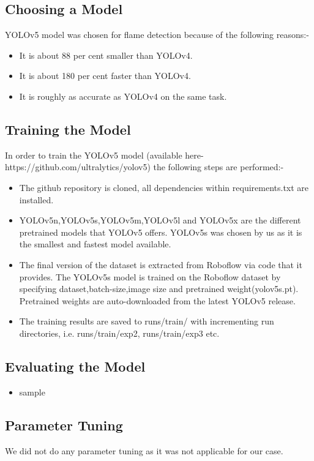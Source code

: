 \documentclass[conference]{IEEEtran}
\begin{document}
\subsection{Choosing a Model}
YOLOv5 model was chosen for flame detection because of the following reasons:-
\begin{itemize}
\item It is about 88 per cent smaller than YOLOv4.
\item It is about 180 per cent faster than YOLOv4.
\item It is roughly as accurate as YOLOv4 on the same task.
\end{itemize}


\subsection{Training the Model}
 In order to train the YOLOv5 model (available here-https://github.com/ultralytics/yolov5) the following steps are performed:-
 \begin{itemize}
 \item The github repository is cloned, all dependencies within requirements.txt are installed.
 \item YOLOv5n,YOLOv5s,YOLOv5m,YOLOv5l and YOLOv5x are the different pretrained models that YOLOv5 offers. YOLOv5s was chosen by us as it is the smallest and fastest model available.
 \item The final version of the dataset is extracted from Roboflow via code that it provides. The YOLOv5s model is trained on the Roboflow dataset by specifying dataset,batch-size,image size and pretrained weight(yolov5s.pt). Pretrained weights are auto-downloaded from the latest YOLOv5 release.
 \item The training results are saved to runs/train/ with incrementing run directories, i.e. runs/train/exp2, runs/train/exp3 etc.
\end{itemize} 


\subsection{Evaluating the Model}
\begin{itemize}
\item sample
\end{itemize}

\subsection{Parameter Tuning}
 We did not do any parameter tuning as it was not applicable for our case.
 
\end{document}
